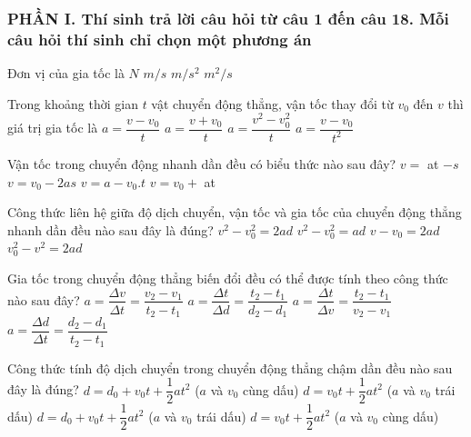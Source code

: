 \subsubsection*{PHẦN I. Thí sinh trả lời câu hỏi từ câu 1 đến câu 18. Mỗi câu hỏi thí sinh chỉ chọn một phương án}
\setcounter{ex}{0}
\begin{ex}%
Đơn vị của gia tốc là
\choice
{$N$}
{$m/s$}
{\True $m/s^2$}
{$m^2/s$}
\loigiai{
}
 \end{ex}
\begin{ex}%
Trong khoảng thời gian $t$ vật chuyển động thẳng, vận tốc thay đổi từ $v_0$ đến $v$ thì giá trị gia tốc là
\choice
{\True $a=\dfrac{v-v_0}{t}$}
{$a=\dfrac{v+v_0}{t}$}
{$a=\dfrac{v^2-v_0^2}{t}$}
{$a=\dfrac{v-v_0}{t^2}$}

\loigiai{
}
 \end{ex}
\begin{ex}%
Vận tốc trong chuyển động nhanh dần đều có biểu thức nào sau đây?
\choice
{$v=$ at $-s$}
{$v=v_0-2 as$}
{$v=a-v_0. t$}
{\True $v=v_0+$ at}

\loigiai{
}
 \end{ex}
\begin{ex}%
Công thức liên hệ giữa độ dịch chuyển, vận tốc và gia tốc của chuyển động thẳng nhanh dần đều nào sau đây là đúng?
\choice
{\True $v^2-v_0^2=2 a d$}
{$v^2-v_0^2=a d$}
{$v-v_0=2 a d$}
{$v_0^2-v^2=2 a d$}

\loigiai{
}
 \end{ex}
\begin{ex}%
Gia tốc trong chuyển động thẳng biến đổi đều có thể được tính theo công thức nào sau đây?
\choice
{\True $a=\dfrac{\Delta v}{\Delta t}=\dfrac{v_2-v_1}{t_2-t_1}$}
{$a=\dfrac{\Delta t}{\Delta d}=\dfrac{t_2-t_1}{d_2-d_1}$}
{$a=\dfrac{\Delta t}{\Delta v}=\dfrac{t_2-t_1}{v_2-v_1}$}
{$a=\dfrac{\Delta d}{\Delta t}=\dfrac{d_2-d_1}{t_2-t_1}$}

\loigiai{
}
 \end{ex}
\begin{ex}%
Công thức tính độ dịch chuyển trong chuyển động thẳng chậm dần đều nào sau đây là đúng?
\choice
{$d=d_0+v_0 t+\dfrac{1}{2} at^2$ ($a$ và $v_0$ cùng dấu)}
{\True $d=v_0 t+\dfrac{1}{2} at^2$ ($a$ và $v_0$ trái dấu)}
{$d=d_0+v_0 t+\dfrac{1}{2} at^2$ ($a$ và $v_0$ trái dấu)}
{$d=v_0 t+\dfrac{1}{2} a t^2$ ($a$ và $v_0$ cùng dấu)}	
\loigiai{
}
 \end{ex}
